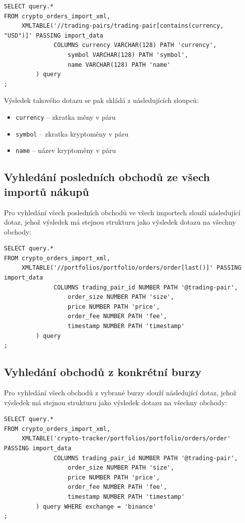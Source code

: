 \documentclass[12pt, a4paper]{article}
\begin{document}
\begin{lstlisting}
SELECT query.*
FROM crypto_orders_import_xml,
     XMLTABLE('//trading-pairs/trading-pair[contains(currency, "USD")]' PASSING import_data
              COLUMNS currency VARCHAR(128) PATH 'currency',
                  symbol VARCHAR(128) PATH 'symbol',
                  name VARCHAR(128) PATH 'name'
         ) query
;

\end{lstlisting}

\noindent
Výsledek takového dotazu se pak skládá z následujících sloupců:
\begin{itemize}
    \item \texttt{currency} -- zkratka měny v páru
    \item \texttt{symbol} -- zkratka kryptoměny v páru
    \item \texttt{name} -- název kryptoměny v páru
\end{itemize}


\subsection{Vyhledání posledních obchodů ze všech importů nákupů}
Pro vyhledání všech posledních obchodů ve všech importech slouží následující dotaz, jehož výsledek má stejnou strukturu jako výsledek dotazu na všechny obchody:

\begin{lstlisting}
SELECT query.*
FROM crypto_orders_import_xml,
     XMLTABLE('//portfolios/portfolio/orders/order[last()]' PASSING import_data
              COLUMNS trading_pair_id NUMBER PATH '@trading-pair',
                  order_size NUMBER PATH 'size',
                  price NUMBER PATH 'price',
                  order_fee NUMBER PATH 'fee',
                  timestamp NUMBER PATH 'timestamp'
         ) query
;
\end{lstlisting}


\subsection{Vyhledání obchodů z konkrétní burzy}
Pro vyhledání všech obchodů z vybrané burzy slouží následující dotaz, jehož výsledek má stejnou strukturu jako výsledek dotazu na všechny obchody:

\begin{lstlisting}
SELECT query.*
FROM crypto_orders_import_xml,
     XMLTABLE('crypto-tracker/portfolios/portfolio/orders/order' PASSING import_data
              COLUMNS trading_pair_id NUMBER PATH '@trading-pair',
                  order_size NUMBER PATH 'size',
                  price NUMBER PATH 'price',
                  order_fee NUMBER PATH 'fee',
                  timestamp NUMBER PATH 'timestamp'
         ) query WHERE exchange = 'binance'
;
\end{lstlisting}
\end{document}
